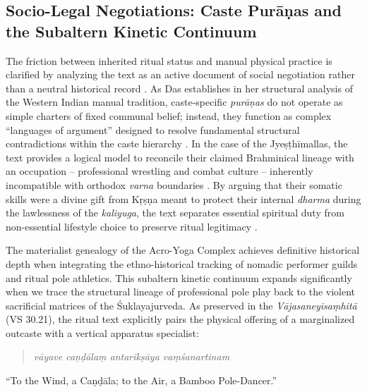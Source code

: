 \documentclass[11pt,twoside,letterpaper]{article}
\begin{document}
\subsection{Socio-Legal Negotiations: Caste Purāṇas and the Subaltern Kinetic Continuum}
The friction between inherited ritual status and manual physical practice is clarified by analyzing the text as an active document of social negotiation rather than a neutral historical record \citep{Das1968}. As Das establishes in her structural analysis of the Western Indian manual tradition, caste-specific \textit{purāṇas} do not operate as simple charters of fixed communal belief; instead, they function as complex ``languages of argument'' designed to resolve fundamental structural contradictions within the caste hierarchy \citep{Das1968}. In the case of the Jyeṣṭhīmallas, the text provides a logical model to reconcile their claimed Brahminical lineage with an occupation -- professional wrestling and combat culture -- inherently incompatible with orthodox \textit{varna} boundaries \citep{Das1968}. By arguing that their somatic skills were a divine gift from Kṛṣṇa meant to protect their internal \textit{dharma} during the lawlessness of the \textit{kaliyuga}, the text separates essential spiritual duty from non-essential lifestyle choice to preserve ritual legitimacy \citep{Das1968}.

The materialist genealogy of the Acro-Yoga Complex achieves definitive historical depth when integrating the ethno-historical tracking of nomadic performer guilds and ritual pole athletics. This subaltern kinetic continuum expands significantly when we trace the structural lineage of professional pole play back to the violent sacrificial matrices of the Śuklayajurveda. As preserved in the \textit{Vājasaneyisaṃhitā} (VS 30.21), the ritual text explicitly pairs the physical offering of a marginalized outcaste with a vertical apparatus specialist: 

\begin{quote}
\textit{vāyave caṇḍālaṃ antarikṣāya vaṃśanartinam}
\end{quote}
``To the Wind, a Caṇḍāla; to the Air, a Bamboo Pole-Dancer.'' 
\end{document}

